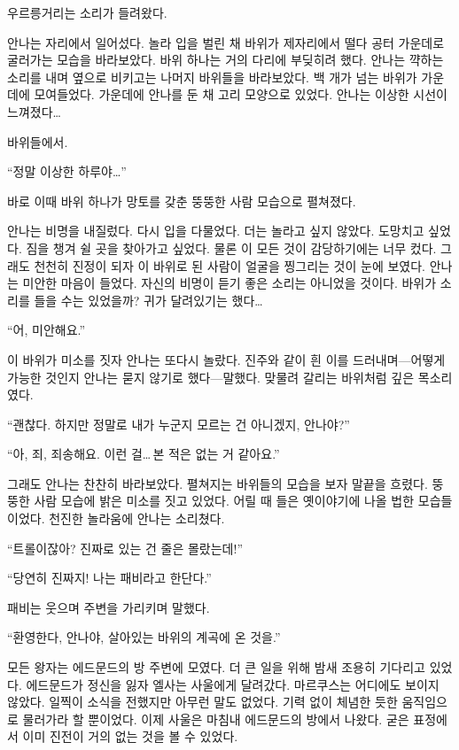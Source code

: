 우르릉거리는 소리가 들려왔다.

안나는 자리에서 일어섰다. 놀라 입을 벌린 채 바위가 제자리에서 떨다 공터 가운데로 굴러가는 모습을 바라보았다. 바위 하나는 거의 다리에 부딪히려 했다. 안나는 꺅하는 소리를 내며 옆으로 비키고는 나머지 바위들을 바라보았다. 백 개가 넘는 바위가 가운데에 모여들었다. 가운데에 안나를 둔 채 고리 모양으로 있었다. 안나는 이상한 시선이 느껴졌다\ldots

바위들에서.

``정말 이상한 하루야\ldots''

바로 이때 바위 하나가 망토를 갖춘 뚱뚱한 사람 모습으로 펼쳐졌다.

안나는 비명을 내질렀다. 다시 입을 다물었다. 더는 놀라고 싶지 않았다. 도망치고 싶었다. 짐을 챙겨 쉴 곳을 찾아가고 싶었다. 물론 이 모든 것이 감당하기에는 너무 컸다. 그래도 천천히 진정이 되자 이 바위로 된 사람이 얼굴을 찡그리는 것이 눈에 보였다. 안나는 미안한 마음이 들었다. 자신의 비명이 듣기 좋은 소리는 아니었을 것이다. 바위가 소리를 들을 수는 있었을까? 귀가 달려있기는 했다\ldots

``어, 미안해요.''

이 바위가 미소를 짓자 안나는 또다시 놀랐다. 진주와 같이 흰 이를 드러내며—어떻게 가능한 것인지 안나는 묻지 않기로 했다—말했다. 맞물려 갈리는 바위처럼 깊은 목소리였다.

``괜찮다. 하지만 정말로 내가 누군지 모르는 건 아니겠지, 안나야?''

``아, 죄, 죄송해요. 이런 걸\ldots\,본 적은 없는 거 같아요.''

그래도 안나는 찬찬히 바라보았다. 펼쳐지는 바위들의 모습을 보자 말끝을 흐렸다. 뚱뚱한 사람 모습에 밝은 미소를 짓고 있었다. 어릴 때 들은 옛이야기에 나올 법한 모습들이었다. 천진한 놀라움에 안나는 소리쳤다.

``트롤이잖아? 진짜로 있는 건 줄은 몰랐는데!''

``당연히 진짜지! 나는 패비라고 한단다.''

패비는 웃으며 주변을 가리키며 말했다.

``환영한다, 안나야, 살아있는 바위의 계곡에 온 것을.''

\textbreak

모든 왕자는 에드문드의 방 주변에 모였다. 더 큰 일을 위해 밤새 조용히 기다리고 있었다. 에드문드가 정신을 잃자 엘사는 사울에게 달려갔다. 마르쿠스는 어디에도 보이지 않았다. 일찍이 소식을 전했지만 아무런 말도 없었다. 기력 없이 체념한 듯한 움직임으로 물러가라 할 뿐이었다. 이제 사울은 마침내 에드문드의 방에서 나왔다. 굳은 표정에서 이미 진전이 거의 없는 것을 볼 수 있었다.

